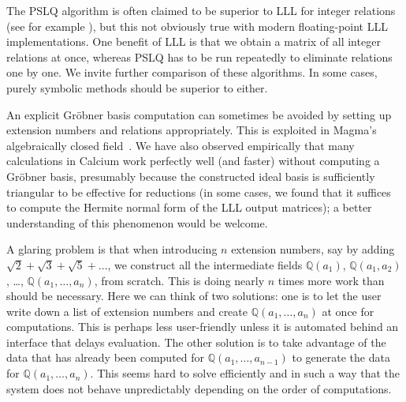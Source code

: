 \documentclass[sigconf,screen,urlbreakonhyphens]{acmart}
\begin{document}
The PSLQ algorithm is often claimed to be superior to LLL for
integer relations (see for example \cite{BBK2014}),
but this not obviously true
with modern floating-point LLL implementations.
One benefit of LLL is that we obtain
a matrix of all integer relations at once,
whereas PSLQ has to be run repeatedly to eliminate relations
one by one. We invite further comparison of these algorithms.
In some cases, purely symbolic methods
should be superior to either.

An explicit Gr\"{o}bner basis computation can sometimes be avoided
by setting up extension numbers and relations appropriately.
This is exploited in Magma's algebraically closed field~\cite{Ste2010}.
We have also observed empirically that many calculations in Calcium
work perfectly well (and faster) without computing a Gr\"{o}bner basis,
presumably because the constructed ideal basis is sufficiently triangular
to be effective for reductions (in some cases, we found that
it suffices to compute the Hermite normal form of the LLL output matrices);
a better understanding of this phenomenon would be welcome.

A glaring problem is that when introducing
$n$ extension numbers,
say by adding $\sqrt{2} + \sqrt{3} + \sqrt{5} + \ldots$,
we construct all the intermediate
fields $\mathbb{Q}(a_1)$, $\mathbb{Q}(a_1,a_2)$, \ldots, $\mathbb{Q}(a_1,\ldots,a_n)$,
from scratch.
This is doing nearly $n$ times more work than should be necessary.
Here we can think of two solutions: one is to let
the user write down a list of extension numbers
and create $\mathbb{Q}(a_1,\ldots,a_n)$ at once for computations.
This is perhaps less user-friendly unless
it is automated behind an interface that delays evaluation.
The other solution is to take advantage of the data that has
already been computed for
$\mathbb{Q}(a_1,\ldots,a_{n-1})$
to generate the data for $\mathbb{Q}(a_1,\ldots,a_n)$.
This seems hard to solve efficiently
and in such a way that the system does not behave
unpredictably depending on the
order of computations.



\end{document}
